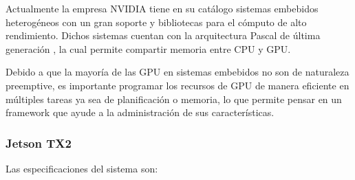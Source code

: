     Actualmente la empresa NVIDIA tiene en su catálogo sistemas embebidos heterogéneos con un gran soporte y bibliotecas para el cómputo de alto rendimiento. Dichos sistemas cuentan con la arquitectura Pascal de última generación \cite{GPUArt}, la cual permite compartir memoria entre CPU y GPU.

   
    Debido a que la mayoría de las GPU en sistemas embebidos no son de naturaleza preemptive, es importante programar los recursos de GPU de manera eficiente en múltiples tareas \cite{TX2I} ya sea de planificación o memoria, lo que permite pensar en un framework que ayude a la administración de sus características. 

 \subsubsection{Jetson TX2}
    Las especificaciones del sistema son:


